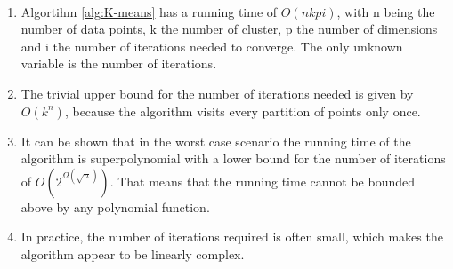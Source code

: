 \begin{remark}~
	\begin{enumerate}[label=(\roman*)]
		\item Algortihm \ref{alg:K-means} has a running time of $O(nkpi)$, with n being the number of data points, k the number of cluster, p the number of dimensions and i the number of iterations needed to converge. The only unknown variable is the number of iterations. 
		\item The trivial upper bound for the number of iterations needed is given by $O(k^n)$, because the algorithm visits every partition of points only once. 
		\item It can be shown \cite{arthur2006slow} that in the worst case scenario the running time of the algorithm is superpolynomial with a lower bound for the number of iterations of $O(2^{\Omega(\sqrt{n})})$. That means that the running time cannot be bounded above by any polynomial function.
		\item In practice, the number of iterations required is often small, which makes the algorithm appear to be linearly complex.  
	\end{enumerate}
\end{remark}

